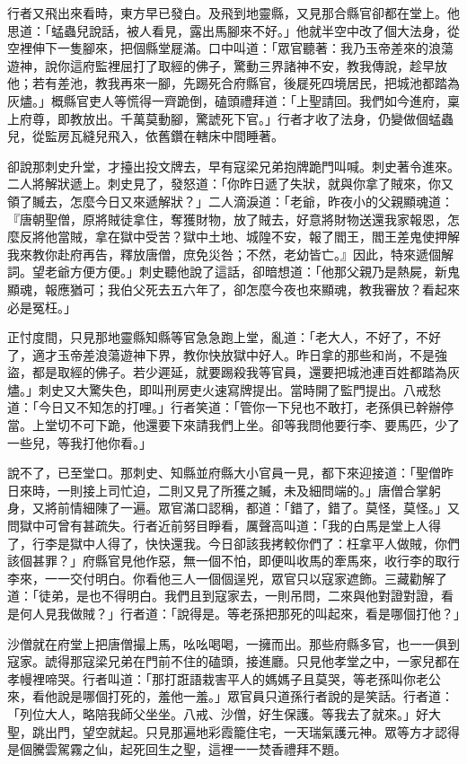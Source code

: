 行者又飛出來看時，東方早已發白。及飛到地靈縣，又見那合縣官卻都在堂上。他思道：「蜢蟲兒說話，被人看見，露出馬腳來不好。」他就半空中改了個大法身，從空裡伸下一隻腳來，把個縣堂屣滿。口中叫道：「眾官聽著：我乃玉帝差來的浪蕩遊神，說你這府監裡屈打了取經的佛子，驚動三界諸神不安，教我傳說，趁早放他；若有差池，教我再來一腳，先踢死合府縣官，後屣死四境居民，把城池都踏為灰燼。」概縣官吏人等慌得一齊跪倒，磕頭禮拜道：「上聖請回。我們如今進府，稟上府尊，即教放出。千萬莫動腳，驚諕死下官。」行者才收了法身，仍變做個蜢蟲兒，從監房瓦縫兒飛入，依舊鑽在轄床中間睡著。

卻說那刺史升堂，才擡出投文牌去，早有寇梁兄弟抱牌跪門叫喊。刺史著令進來。二人將解狀遞上。刺史見了，發怒道：「你昨日遞了失狀，就與你拿了賊來，你又領了贓去，怎麼今日又來遞解狀？」二人滴淚道：「老爺，昨夜小的父親顯魂道：『唐朝聖僧，原將賊徒拿住，奪獲財物，放了賊去，好意將財物送還我家報恩，怎麼反將他當賊，拿在獄中受苦？獄中土地、城隍不安，報了閻王，閻王差鬼使押解我來教你赴府再告，釋放唐僧，庶免災咎；不然，老幼皆亡。』因此，特來遞個解詞。望老爺方便方便。」刺史聽他說了這話，卻暗想道：「他那父親乃是熱屍，新鬼顯魂，報應猶可；我伯父死去五六年了，卻怎麼今夜也來顯魂，教我審放？看起來必是冤枉。」

正忖度間，只見那地靈縣知縣等官急急跑上堂，亂道：「老大人，不好了，不好了，適才玉帝差浪蕩遊神下界，教你快放獄中好人。昨日拿的那些和尚，不是強盜，都是取經的佛子。若少遲延，就要踢殺我等官員，還要把城池連百姓都踏為灰燼。」刺史又大驚失色，即叫刑房吏火速寫牌提出。當時開了監門提出。八戒愁道：「今日又不知怎的打哩。」行者笑道：「管你一下兒也不敢打，老孫俱已幹辦停當。上堂切不可下跪，他還要下來請我們上坐。卻等我問他要行李、要馬匹，少了一些兒，等我打他你看。」

說不了，已至堂口。那刺史、知縣並府縣大小官員一見，都下來迎接道：「聖僧昨日來時，一則接上司忙迫，二則又見了所獲之贓，未及細問端的。」唐僧合掌躬身，又將前情細陳了一遍。眾官滿口認稱，都道：「錯了，錯了。莫怪，莫怪。」又問獄中可曾有甚疏失。行者近前努目睜看，厲聲高叫道：「我的白馬是堂上人得了，行李是獄中人得了，快快還我。今日卻該我拷較你們了：枉拿平人做賊，你們該個甚罪？」府縣官見他作惡，無一個不怕，即便叫收馬的牽馬來，收行李的取行李來，一一交付明白。你看他三人一個個逞兇，眾官只以寇家遮飾。三藏勸解了道：「徒弟，是也不得明白。我們且到寇家去，一則吊問，二來與他對證對證，看是何人見我做賊？」行者道：「說得是。等老孫把那死的叫起來，看是哪個打他？」

沙僧就在府堂上把唐僧撮上馬，吆吆喝喝，一擁而出。那些府縣多官，也一一俱到寇家。諕得那寇梁兄弟在門前不住的磕頭，接進廳。只見他孝堂之中，一家兒都在孝幔裡啼哭。行者叫道：「那打誑語栽害平人的媽媽子且莫哭，等老孫叫你老公來，看他說是哪個打死的，羞他一羞。」眾官員只道孫行者說的是笑話。行者道：「列位大人，略陪我師父坐坐。八戒、沙僧，好生保護。等我去了就來。」好大聖，跳出門，望空就起。只見那遍地彩霞籠住宅，一天瑞氣護元神。眾等方才認得是個騰雲駕霧之仙，起死回生之聖，這裡一一焚香禮拜不題。

